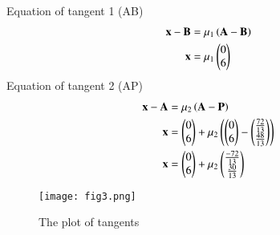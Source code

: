 \documentclass[journal,12pt,twocolumn]{IEEEtran}
\begin{document}
Equation of tangent 1 (AB)
\begin{align}
    \mathbf{x}-\mathbf{B}&=\mu_{1}\left(\mathbf{A}-\mathbf{B}\right)\\
    \mathbf{x}&=\mu_{1}\begin{pmatrix}0\\6\end{pmatrix}
\end{align}
Equation of tangent 2 (AP)
\begin{align}
    \mathbf{x}-\mathbf{A}&=\mu_{2}\left(\mathbf{A}-\mathbf{P}\right)\\
    \mathbf{x}&=\begin{pmatrix}0\\6\end{pmatrix}+\mu_{2}\left(\begin{pmatrix}0\\6\end{pmatrix}-\begin{pmatrix}\frac{72}{13}\\ \frac{48}{13}\end{pmatrix}\right)\\
    \mathbf{x}&=\begin{pmatrix}0\\6\end{pmatrix}+\mu_{2}\begin{pmatrix}\frac{-72}{13}\\ \frac{30}{13}\end{pmatrix}
\end{align}
\begin{figure}[!ht]
   \centering
   \texttt{[image: fig3.png]}
   \caption{The plot of tangents}
\end{figure}
\end{document}
